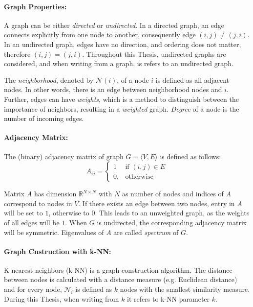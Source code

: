 \paragraph{Graph Properties:}
A graph can be either \textit{directed} or \textit{undirected}. 
In a directed graph, an edge connects explicitly from one node to another, consequently edge $(i, j) \neq (j, i)$. 
In an undirected graph, edges have no direction, and ordering does not matter, therefore $(i, j) = (j, i)$.
Throughout this Thesis, undirected graphs are considered, and when writing from a graph, is refers to an undirected graph.

The \textit{neighborhood}, denoted by $\mathcal{N}(i)$, of a node $i$  is defined as all adjacent nodes.
In other words, there is an edge between neighborhood nodes and $i$. 
Further, edges can have \textit{weights}, which is a method to distinguish between the importance of neighbors, resulting in a \textit{weighted} graph.
\textit{Degree} of a node is the number of incoming edges.

\paragraph{Adjacency Matrix:}
The (binary) adjacency matrix of graph $G = \langle V, E \rangle$ is defined as follows:
\begin{equation}
    \label{eg:AdjacencyMatrix}
    A_{ij} =    
    \begin{cases}
        1  & \text{if } (i, j) \in E \\
        0, & \text{otherwise}
    \end{cases}
\end{equation}

Matrix $A$ has dimension $\mathbb{R}^{N \times N}$ with $N$ as number of nodes
and indices of $A$ correspond to nodes in $V$.
If there exists an edge between two nodes, entry in $A$ will be set to $1$, otherwise to $0$.
This leads to an unweighted graph, as the weights of all edges will be $1$.
When $G$ is undirected, the corresponding adjacency matrix will be symmetric. 
Eigenvalues of $A$ are called \textit{spectrum} of $G$.

\paragraph{Graph Cnstruction with k-NN:}
K-nearest-neighbors (k-NN) is a graph construction algorithm. The distance between
nodes is calculated with a distance measure (e.g. Euclidean distance) and 
for every node, $\mathcal{N}_i$ is defined as $k$ nodes with the smallest similarity measure.
During this Thesis, when writing from $k$ it refers to k-NN parameter $k$.


